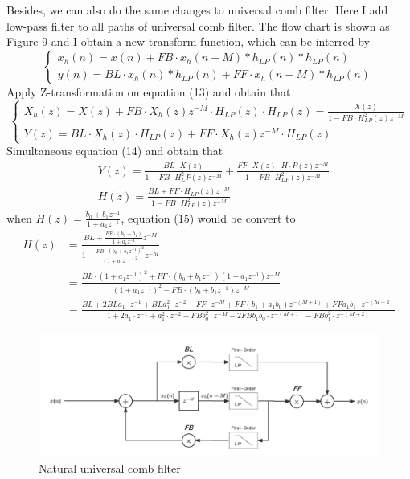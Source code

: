 \documentclass[a4paper]{tufte-handout} %
\begin{document}
Besides, we can also do the same changes to universal comb filter. Here I add low-pass filter to all paths of universal comb filter. The flow chart is shown as Figure 9 and I obtain a new transform function, which can be interred by
\begin{equation}
\begin{cases}
  x_h(n)=x(n)+ FB \cdot x_h(n-M) \ast h_{LP}(n) \ast h_{LP}(n)  \\
  y(n)= BL \cdot x_h(n) \ast h_{LP}(n) + FF \cdot x_h(n-M) \ast h_{LP}(n)
\end{cases}
\end{equation}
Apply Z-transformation on equation (13) and obtain that
\begin{equation}
\begin{cases}
  X_h(z)=X(z) + FB \cdot X_h(z)z^{-M} \cdot H_{LP}(z) \cdot H_{LP}(z)=\frac{X(z)}{1-FB \cdot H_{LP}^2(z)z^{-M}} \\
  Y(z) = BL \cdot X_h(z) \cdot H_{LP}(z) + FF \cdot X_h(z)z^{-M} \cdot H_{LP}(z)
\end{cases}
\end{equation}
Simultaneous equation (14) and obtain that
\begin{equation}
  \begin{aligned}
      &Y(z)=\frac{BL \cdot X(z)}{1-FB \cdot H^2_LP(z)z^{-M}}+\frac{FF \cdot X(z) \cdot H_LP(z)z^{-M}}{1-FB \cdot H^2_{LP}(z)z^{-M}} \\
      &H(z)=\frac{BL+FF \cdot H_{LP}(z)z^{-M}}{1-FB \cdot H_{LP}^2(z)z^{-M}} 
  \end{aligned}
\end{equation}
when $H(z)=\frac{b_0+b_1z^{-1}}{1+a_1z^{-1}}$, equation (15) would be convert to
\begin{equation}
  \begin{aligned}
      H(z)&=\frac{BL+\frac{FF \cdot (b_0+b_1)}{1+a_1z^{-1}}z^{-M}}{1-\frac{FB \cdot (b_0+b_1z^{-1})^2}{(1+a_1z^{-1})^2}z^{-M}} \\
      &=\frac{BL \cdot (1+a_1z^{-1})^2+FF \cdot (b_0+b_1z^{-1})(1+a_1z^{-1})z^{-M}}{(1+a_1z^{-1})^2-FB \cdot (b_0+b_1z^{-1})z^{-M}} \\
      &=\frac{BL+2BLa_1 \cdot z^{-1}+BLa_1^2 \cdot z^{-2}+FF \cdot z^{-M}+FF(b_1+a_1b_0)z^{-(M+1)}+FFa_1b_1 \cdot z^{-(M+2)}}{1+2a_1 \cdot z^{-1}+a_1^2 \cdot z^{-2}-FBb_0^2 \cdot z^{-M}-2FBb_1b_0 \cdot z^{-(M+1)}-FBb_1^2 \cdot z^{-(M+2)}}
  \end{aligned}
\end{equation}

\begin{figure}[h]
    \centering
	\includegraphics[width=4.5in]{Image/UniversalNatural.png}
	\caption{Natural universal comb filter}
	\label{fig:textfig}
\end{figure}
\end{document}
